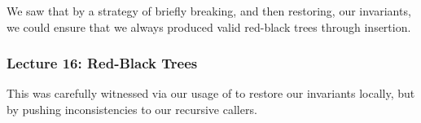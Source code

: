 \documentclass[aspectratio=169, handout]{beamer}
\begin{document}
{\begin{frame}[fragile]
\begin{center}
\begin{minipage}{0.6\textwidth}
      We saw that by a strategy of briefly breaking, and then restoring, our invariants, we could
      ensure that we always produced valid red-black trees through insertion.
    \end{minipage}
    \hfill
    \begin{minipage}{0.37\textwidth}
      \begin{center}
      \end{center}
    \end{minipage}
  \end{center}
\end{frame}

\begin{frame}[fragile]
  \frametitle{Lecture 16: Red-Black Trees}

  This was carefully witnessed via our usage of  to restore our invariants
  locally, but by pushing inconsistencies to our recursive callers.

  \pause
  \vspace{\fill}


\end{frame}}
\end{document}
